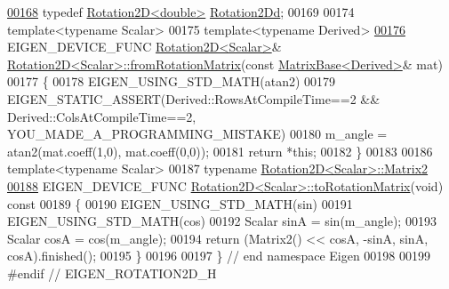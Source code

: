 \begin{DoxyCode}
\hyperlink{group___geometry___module_ga610359336130abe9a396ca159b3e8258}{00168} \textcolor{keyword}{typedef} \hyperlink{group___geometry___module_class_eigen_1_1_rotation2_d}{Rotation2D<double>} \hyperlink{group___geometry___module_ga610359336130abe9a396ca159b3e8258}{Rotation2Dd};
00169 
00174 \textcolor{keyword}{template}<\textcolor{keyword}{typename} Scalar>
00175 \textcolor{keyword}{template}<\textcolor{keyword}{typename} Derived>
\hyperlink{group___geometry___module_af999ce86ea9fadc925fdf50fb0e3a962}{00176} EIGEN\_DEVICE\_FUNC \hyperlink{group___geometry___module_class_eigen_1_1_rotation2_d}{Rotation2D<Scalar>}& 
      \hyperlink{group___geometry___module_class_eigen_1_1_rotation2_d}{Rotation2D<Scalar>::fromRotationMatrix}(\textcolor{keyword}{const} 
      \hyperlink{group___core___module_class_eigen_1_1_matrix_base}{MatrixBase<Derived>}& mat)
00177 \{
00178   EIGEN\_USING\_STD\_MATH(atan2)
00179   EIGEN\_STATIC\_ASSERT(Derived::RowsAtCompileTime==2 && Derived::ColsAtCompileTime==2,
      YOU\_MADE\_A\_PROGRAMMING\_MISTAKE)
00180   m\_angle = atan2(mat.coeff(1,0), mat.coeff(0,0));
00181   \textcolor{keywordflow}{return} *\textcolor{keyword}{this};
00182 \}
00183 
00186 \textcolor{keyword}{template}<\textcolor{keyword}{typename} Scalar>
00187 \textcolor{keyword}{typename} \hyperlink{group___core___module_class_eigen_1_1_matrix}{Rotation2D<Scalar>::Matrix2}
\hyperlink{group___geometry___module_a417985ee6adae46447bb1b1d8d17a824}{00188} EIGEN\_DEVICE\_FUNC \hyperlink{group___geometry___module_a417985ee6adae46447bb1b1d8d17a824}{Rotation2D<Scalar>::toRotationMatrix}(\textcolor{keywordtype}{void})\textcolor{keyword}{ const}
00189 \textcolor{keyword}{}\{
00190   EIGEN\_USING\_STD\_MATH(sin)
00191   EIGEN\_USING\_STD\_MATH(cos)
00192   Scalar sinA = sin(m\_angle);
00193   Scalar cosA = cos(m\_angle);
00194   \textcolor{keywordflow}{return} (Matrix2() << cosA, -sinA, sinA, cosA).finished();
00195 \}
00196 
00197 \} \textcolor{comment}{// end namespace Eigen}
00198 
00199 \textcolor{preprocessor}{#endif // EIGEN\_ROTATION2D\_H}
\end{DoxyCode}
